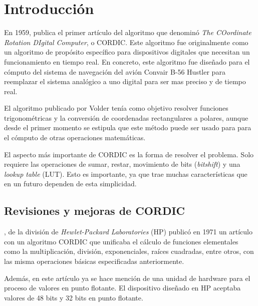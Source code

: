 
\chapter{Introducción}

En 1959, \citeauthor{volder_cordic_1959} publica el primer artículo del algoritmo que denominó \textit{The COordinate Rotation DIgital Computer}, o CORDIC. Este algoritmo fue originalmente como un algoritmo de propósito específico para dispositivos digitales que necesitan un funcionamiento en tiempo real. En concreto, este algoritmo fue diseñado para el cómputo del sistema de navegación del avión Convair B-56 Hustler para reemplazar el sistema analógico a uno digital para ser mas preciso y de tiempo real. 

El algoritmo publicado por Volder tenía como objetivo resolver funciones trigonométricas y la conversión de coordenadas rectangulares a polares, aunque desde el primer momento se estipula que este método puede ser usado para para el cómputo de otras operaciones matemáticas.

El aspecto más importante de CORDIC es la forma de resolver el problema. Solo requiere las operaciones de sumar, restar, movimiento de bits (\textit{bitshift}) y una \textit{lookup table} (LUT). Esto es importante, ya que trae muchas características que en un futuro dependen de esta simplicidad.


\section{Revisiones y mejoras de CORDIC}

\cite{walther_unified_1971}, de la división de \textit{Hewlet-Packard Laboratories} (HP) publicó en 1971 un artículo con un algoritmo CORDIC que unificaba el cálculo de funciones elementales como la multiplicación, división, exponenciales, raíces cuadradas, entre otros, con las misma operaciones básicas especificadas anteriormente.

Además, en este artículo ya se hace mención de una unidad de hardware para el proceso de valores en punto flotante. El dispositivo diseñado en HP aceptaba valores de 48 bits y 32 bits en punto flotante.

